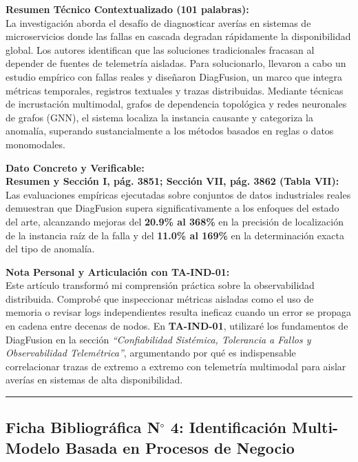 \documentclass[11pt,a4paper]{article}
\begin{document}
\vspace{2mm}
\noindent\textbf{Resumen Técnico Contextualizado (101 palabras):}\\
La investigación aborda el desafío de diagnosticar averías en sistemas de microservicios donde las fallas en cascada degradan rápidamente la disponibilidad global. Los autores identifican que las soluciones tradicionales fracasan al depender de fuentes de telemetría aisladas. Para solucionarlo, llevaron a cabo un estudio empírico con fallas reales y diseñaron DiagFusion, un marco que integra métricas temporales, registros textuales y trazas distribuidas. Mediante técnicas de incrustación multimodal, grafos de dependencia topológica y redes neuronales de grafos (GNN), el sistema localiza la instancia causante y categoriza la anomalía, superando sustancialmente a los métodos basados en reglas o datos monomodales.

\vspace{2mm}
\noindent\textbf{Dato Concreto y Verificable:}\\
\textbf{Resumen y Sección I, pág. 3851; Sección VII, pág. 3862 (Tabla VII):} Las evaluaciones empíricas ejecutadas sobre conjuntos de datos industriales reales demuestran que DiagFusion supera significativamente a los enfoques del estado del arte, alcanzando mejoras del \textbf{20.9\% al 368\%} en la precisión de localización de la instancia raíz de la falla y del \textbf{11.0\% al 169\%} en la determinación exacta del tipo de anomalía.

\vspace{2mm}
\noindent\textbf{Nota Personal y Articulación con TA-IND-01:}\\
Este artículo transformó mi comprensión práctica sobre la observabilidad distribuida. Comprobé que inspeccionar métricas aisladas como el uso de memoria o revisar logs independientes resulta ineficaz cuando un error se propaga en cadena entre decenas de nodos. En \textbf{TA-IND-01}, utilizaré los fundamentos de DiagFusion en la sección \textit{``Confiabilidad Sistémica, Tolerancia a Fallos y Observabilidad Telemétrica''}, argumentando por qué es indispensable correlacionar trazas de extremo a extremo con telemetría multimodal para aislar averías en sistemas de alta disponibilidad.

\vspace{4mm}
\hrule
\vspace{5mm}

\subsection*{Ficha Bibliográfica N$^\circ$ 4: Identificación Multi-Modelo Basada en Procesos de Negocio}
\end{document}
